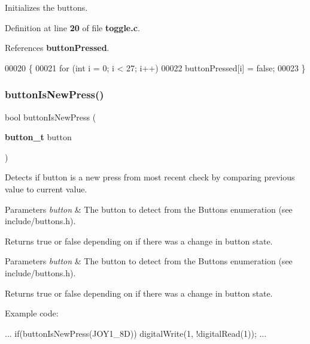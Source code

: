 Initializes the buttons. 

Definition at line \textbf{ 20} of file \textbf{ toggle.\+c}.



References \textbf{ button\+Pressed}.


\begin{DoxyCode}
00020                   \{
00021     \textcolor{keywordflow}{for} (\textcolor{keywordtype}{int} i = 0; i < 27; i++)
00022         buttonPressed[i] = \textcolor{keyword}{false};
00023 \}
\end{DoxyCode}
\mbox{\label{toggle_8h_ae819f86fad1b51d66f4294140b53ff77}} 
\subsubsection{button\+Is\+New\+Press()}
{\footnotesize\ttfamily bool button\+Is\+New\+Press (\begin{DoxyParamCaption}\item[{\textbf{ button\+\_\+t}}]{button }\end{DoxyParamCaption})}



Detects if button is a new press from most recent check by comparing previous value to current value. 


\begin{DoxyParams}{Parameters}
{\em button} & The button to detect from the Buttons enumeration (see include/buttons.\+h).\\
\hline
\end{DoxyParams}
\begin{DoxyReturn}{Returns}
true or false depending on if there was a change in button state.
\end{DoxyReturn}

\begin{DoxyParams}{Parameters}
{\em button} & The button to detect from the Buttons enumeration (see include/buttons.\+h).\\
\hline
\end{DoxyParams}
\begin{DoxyReturn}{Returns}
true or false depending on if there was a change in button state.
\end{DoxyReturn}
Example code\+: 
\begin{DoxyCode}
...
if(buttonIsNewPress(JOY1_8D))
    digitalWrite(1, !digitalRead(1));
...
\end{DoxyCode}
 

